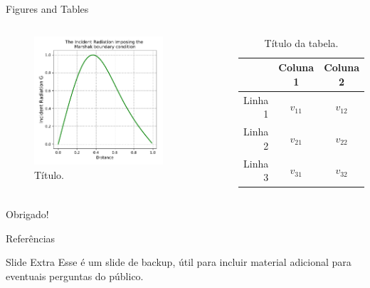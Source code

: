 \documentclass[aspectratio=169]{beamer}
\begin{document}
\begin{frame}{Figures and Tables}
	\begin{columns}
         \begin{figure}
         	\centering
            \includegraphics[width=0.8\textwidth]{./img/gw_d.pdf}
            \caption{Título.}
            \label{fig:focusl}
        \end{figure}    
        \begin{table}
       	\centering
        	\begin{tabular}{rcc}
            	& Coluna 1 & Coluna 2 \\\hline
                Linha 1 & \(v_{11}\) & \(v_{12}\) \\
                Linha 2 & \(v_{21}\) & \(v_{22}\) \\
               	Linha 3 & \(v_{31}\) & \(v_{32}\) \\
            \end{tabular}
        \caption{Título da tabela.}
        \label{tab:demo}
        \end{table}
    \end{columns}
\end{frame}
\begin{frame}[focus]
	Obrigado!
\end{frame}
\appendix
\begin{frame}{Referências}
    \nocite{*}
    
	
\end{frame}
\begin{frame}{Slide Extra}
	Esse é um slide de backup, útil para incluir material adicional para eventuais perguntas do público.
	\vfill
\end{frame}
\end{document}
